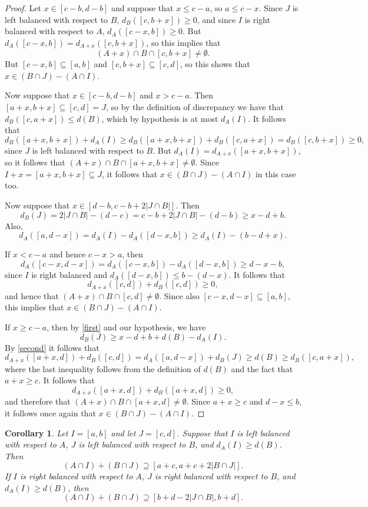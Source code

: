 \documentclass[11pt,reqno]{amsart}
\newtheorem{corollary}[theorem]{Corollary}
\theoremstyle{definition}
\def\subset{\subseteq}
\def\supset{\supseteq}
\begin{document}
\begin{proof}
Let $x\in[c-b,d-b]$ and suppose that $x\leq c-a$, so $a\leq c-x$. Since $J$ is left balanced with respect to $B$, $d_B([c,b+x])\geq 0$, and since $I$ is right balanced with respect to $A$, $d_A([c-x,b])\geq 0$. But $d_A([c-x,b])=d_{A+x}([c,b+x])$, so this implies that 
\[(A+x)\cap B\cap[c,b+x]\ne\emptyset.\] 
But $[c-x,b]\subset[a,b]$ and $[c,b+x]\subset[c,d]$, so this shows that $x\in(B\cap J)-(A\cap I)$. 

Now suppose that $x\in[c-b,d-b]$ and $x>c-a$. Then $[a+x,b+x]\subset [c,d]=J$, so by the definition of discrepancy we have that $d_B([c,a+x])\leq d(B)$, which by hypothesis is at most $d_A(I)$. It follows that
\[d_B([a+x,b+x])+d_A(I)\geq d_B([a+x,b+x])+d_B([c,a+x])=d_B([c,b+x])\geq 0,\]
since $J$ is left balanced with respect to $B$. But $d_A(I)=d_{A+x}([a+x,b+x])$, so it follows that $(A+x)\cap B\cap[a+x,b+x]\ne\emptyset$. Since $I+x=[a+x,b+x]\subset J$, it follows that $x\in(B\cap J)-(A\cap I)$ in this case too.

Now suppose that $x\in[d-b,c-b+2|J\cap B|]$. Then 
\begin{equation}
d_B(J)=2|J\cap B|-(d-c)=c-b+2|J\cap B|-(d-b)\geq x-d+b.\label{first}
\end{equation}
Also,
\begin{equation}
d_A([a,d-x])=d_A(I)-d_A([d-x,b])\geq d_A(I)-(b-d+x).\label{second}
\end{equation}

If $x<c-a$ and hence $c-x>a$, then
\[d_A([c-x,d-x])=d_A([c-x,b])-d_A([d-x,b])\geq d-x-b,\]
since $I$ is right balanced and $d_A([d-x,b])\leq b-(d-x)$. It follows that
\[d_{A+x}([c,d])+d_B([c,d])\geq 0,\]
and hence that $(A+x)\cap B\cap [c,d]\ne\emptyset$. Since also $[c-x,d-x]\subset[a,b]$, this implies that $x\in(B\cap J)-(A\cap I)$.

If $x\geq c-a$, then by \eqref{first} and our hypothesis, we have
\[d_B(J)\geq x-d+b+d(B)-d_A(I).\]
By \eqref{second} it follows that
\[d_{A+x}([a+x,d])+d_B([c,d])=d_A([a,d-x])+d_B(J)\geq d(B)\geq d_B([c,a+x]),\]
where the last inequality follows from the definition of $d(B)$ and the fact that $a+x\geq c$. It follows that
\[d_{A+x}([a+x,d])+d_B([a+x,d])\geq 0,\]
and therefore that $(A+x)\cap B\cap[a+x,d]\ne\emptyset$.
Since $a+x\geq c$ and $d-x\leq b$, it follows once again that $x\in (B\cap J)-(A\cap I)$.
\end{proof}

\begin{corollary} \label{main step sums}
Let $I=[a,b]$ and let $J=[c,d]$. Suppose that $I$ is left balanced with respect to $A$, $J$ is left balanced with respect to $B$, and $d_A(I)\geq d(B)$. Then 
\[(A\cap I)+(B\cap J)\supset[a+c,a+c+2|B\cap J|].\]
If $I$ is right balanced with respect to $A$, $J$ is right balanced with respect to $B$, and $d_A(I)\geq d(B)$, then
\[(A\cap I)+(B\cap J)\supset[b+d-2|J\cap B|,b+d].\]
\end{corollary}
\end{document}
